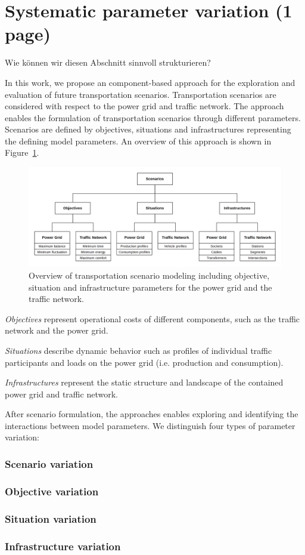 \section{Systematic parameter variation (1 page)}
\label{section:contribution_2}

{\color{red} Wie k\"onnen wir diesen Abschnitt sinnvoll strukturieren?}

In this work, we propose an component-based approach for the exploration and evaluation of future transportation scenarios. Transportation scenarios are considered with respect to the power grid and traffic network. The approach enables the formulation of transportation scenarios through different parameters. Scenarios are defined by objectives, situations and infrastructures representing the defining model parameters. An overview of this approach is shown in Figure~\ref{fig:approach}. 

\begin{figure}[h]
	\centering
	\includegraphics[width=\columnwidth]{../gfx/approach.png}
	\caption{Overview of transportation scenario modeling including objective, situation and infrastructure parameters for the power grid and the traffic network.}
	\label{fig:approach}
\end{figure}

\textit{Objectives} represent operational costs of different components, such as the traffic network and the power grid. 

\textit{Situations}  describe dynamic behavior such as profiles of individual traffic participants and loads on the power grid (i.e. production and consumption).

\textit{Infrastructures} represent the static structure and landscape of the contained power grid and traffic network. 

After scenario formulation, the approaches enables exploring and identifying the interactions between model parameters. We distinguish four types of parameter variation:

\subsubsection{Scenario variation}

\subsubsection{Objective variation}

\subsubsection{Situation variation}

\subsubsection{Infrastructure variation}